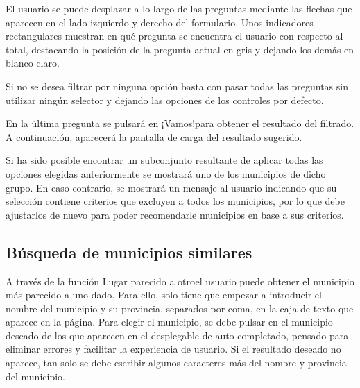 
El usuario se puede desplazar a lo largo de las preguntas mediante las flechas que aparecen en el lado izquierdo y derecho del formulario. Unos indicadores rectangulares muestran en qué pregunta se encuentra el usuario con respecto al total, destacando la posición de la pregunta actual en gris y dejando los demás en blanco claro.


Si no se desea filtrar por ninguna opción basta con pasar todas las preguntas sin utilizar ningún selector y dejando las opciones de los controles por defecto.


En la última pregunta se pulsará en \guillemotleft ¡Vamos!\guillemotright\space para obtener el resultado del filtrado. A continuación, aparecerá la pantalla de carga del resultado sugerido.


Si ha sido posible encontrar un subconjunto resultante de aplicar todas las opciones elegidas anteriormente se mostrará uno de los municipios de dicho grupo. En caso contrario, se mostrará un mensaje al usuario indicando que su selección contiene criterios que excluyen a todos los municipios, por lo que debe ajustarlos de nuevo para poder recomendarle municipios en base a sus criterios.


\subsection{Búsqueda de municipios similares}

A través de la función \guillemotleft Lugar parecido a otro\guillemotright\space el usuario puede obtener el municipio más parecido a uno dado. Para ello, solo tiene que empezar a introducir el nombre del municipio y su provincia, separados por coma, en la caja de texto que aparece en la página. Para elegir el municipio, se debe pulsar en el municipio deseado de los que aparecen en el desplegable de auto-completado, pensado para eliminar errores y facilitar la experiencia de usuario. Si el resultado deseado no aparece, tan solo se debe escribir algunos caracteres más del nombre y provincia del municipio.

